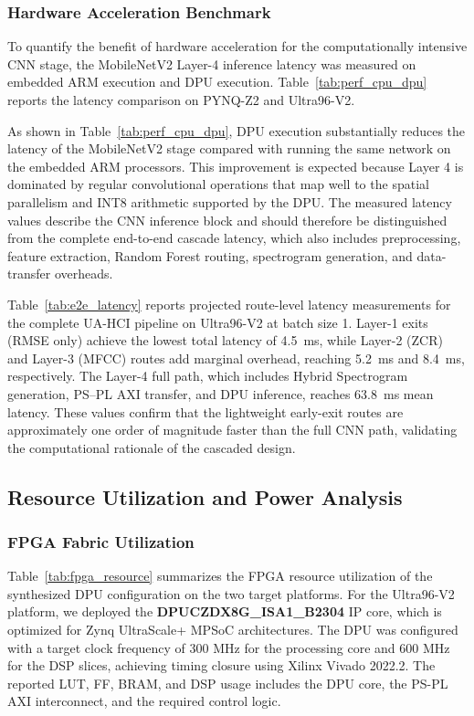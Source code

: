 

\subsubsection{Hardware Acceleration Benchmark}
To quantify the benefit of hardware acceleration for the computationally intensive CNN stage, the MobileNetV2 Layer-4 inference latency was measured on embedded ARM execution and DPU execution. Table~\ref{tab:perf_cpu_dpu} reports the latency comparison on PYNQ-Z2 and Ultra96-V2.



As shown in Table~\ref{tab:perf_cpu_dpu}, DPU execution substantially reduces the latency of the MobileNetV2 stage compared with running the same network on the embedded ARM processors. This improvement is expected because Layer 4 is dominated by regular convolutional operations that map well to the spatial parallelism and INT8 arithmetic supported by the DPU. The measured latency values describe the CNN inference block and should therefore be distinguished from the complete end-to-end cascade latency, which also includes preprocessing, feature extraction, Random Forest routing, spectrogram generation, and data-transfer overheads.

Table~\ref{tab:e2e_latency} reports projected route-level latency measurements for the complete UA-HCI pipeline on Ultra96-V2 at batch size 1. Layer-1 exits (RMSE only) achieve the lowest total latency of 4.5~ms, while Layer-2 (ZCR) and Layer-3 (MFCC) routes add marginal overhead, reaching 5.2~ms and 8.4~ms, respectively. The Layer-4 full path, which includes Hybrid Spectrogram generation, PS--PL AXI transfer, and DPU inference, reaches 63.8~ms mean latency. These values confirm that the lightweight early-exit routes are approximately one order of magnitude faster than the full CNN path, validating the computational rationale of the cascaded design.



\subsection{Resource Utilization and Power Analysis}
\subsubsection{FPGA Fabric Utilization}
Table~\ref{tab:fpga_resource} summarizes the FPGA resource utilization of the synthesized DPU configuration on the two target platforms. For the Ultra96-V2 platform, we deployed the \textbf{DPUCZDX8G\_ISA1\_B2304} IP core, which is optimized for Zynq UltraScale+ MPSoC architectures. The DPU was configured with a target clock frequency of 300 MHz for the processing core and 600 MHz for the DSP slices, achieving timing closure using Xilinx Vivado 2022.2. The reported LUT, FF, BRAM, and DSP usage includes the DPU core, the PS-PL AXI interconnect, and the required control logic.

